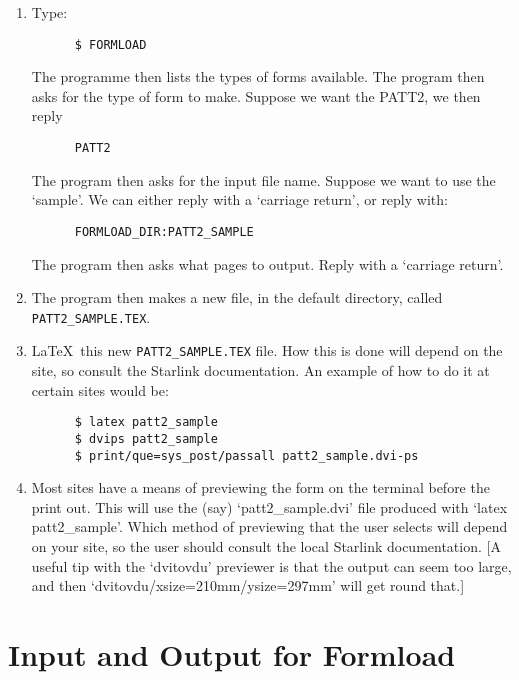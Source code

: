 \begin{enumerate}

\item Type:
      \begin{verbatim}
      $ FORMLOAD
      \end{verbatim}
      The programme then lists the types of forms available.
      The program then asks for the type of form to make. Suppose we 
      want the  PATT2, we then reply
      \begin{verbatim}
      PATT2
      \end{verbatim}
      The program then asks for the input file name. Suppose we want 
      to use the `sample'. We can either reply with a `carriage return', 
      or reply with:
      \begin{verbatim}
      FORMLOAD_DIR:PATT2_SAMPLE
      \end{verbatim}
      The program then asks what pages to output. Reply with a `carriage 
      return'.

\item The program then makes a new file, in the default directory, called
      {\tt PATT2\_SAMPLE.TEX}.

\item \LaTeX\ this new {\tt PATT2\_SAMPLE.TEX} file. How this is done will
      depend on the site, so consult the Starlink documentation. An example 
      of how to do it at certain sites would be:
      \begin{verbatim}
      $ latex patt2_sample
      $ dvips patt2_sample
      $ print/que=sys_post/passall patt2_sample.dvi-ps
      \end{verbatim}

\item Most sites have a means of previewing the form on the terminal before 
      the print out. This will use the (say) `patt2\_sample.dvi' file produced
      with `latex patt2\_sample'. Which method of previewing that the user 
      selects will depend on your site, so the user should consult the local
      Starlink documentation. [A useful tip with the `dvitovdu' previewer 
      is that the output can seem too large, and then 
      `dvitovdu/xsize=210mm/ysize=297mm' will get round that.]

\end{enumerate}


\section{Input and Output for Formload}

